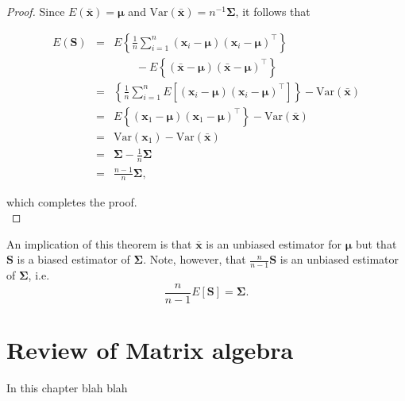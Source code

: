 \documentclass[]{book}
\theoremstyle{definition}
\theoremstyle{definition}
\theoremstyle{definition}
\theoremstyle{remark}
\begin{document}
\begin{proof}
Since \(E(\bar{\boldsymbol x})=\boldsymbol \mu\) and \(\text{Var}(\bar{\boldsymbol x})=n^{-1}\boldsymbol \Sigma\), it follows that

\begin{eqnarray*}
E(\boldsymbol S) &=& E\left \{\frac{1}{n}\sum_{i=1}^n  (\boldsymbol x_i - \boldsymbol \mu)(\boldsymbol x_i - \boldsymbol \mu)^\top \right \}\\
&& \qquad -E\left \{ (\bar{\boldsymbol x}-\boldsymbol \mu)(\bar{\boldsymbol x}-\boldsymbol \mu)^\top \right \}\\
&=&\left \{\frac{1}{n}\sum_{i=1}^n E \left [(\boldsymbol x_i - \boldsymbol \mu)(\boldsymbol x_i - \boldsymbol \mu)^\top \right ]\right \} -\text{Var}(\bar{\boldsymbol x})\\
&=&E \left \{(\boldsymbol x_1 - \boldsymbol \mu)(\boldsymbol x_1  - \boldsymbol \mu)^\top \right \} -\text{Var}(\bar{\boldsymbol x})\\
&=& \text{Var}(\boldsymbol x_1)-\text{Var}(\bar{\boldsymbol x}) \\
&=& \boldsymbol \Sigma- \frac{1}{n}\boldsymbol \Sigma\\
&=& \frac{n-1}{n}  \boldsymbol \Sigma,
\end{eqnarray*}

which completes the proof.\\
\end{proof}

An implication of this theorem is that \(\bar{\boldsymbol x}\) is an unbiased estimator for \(\boldsymbol \mu\) but that \(\boldsymbol S\) is a biased estimator of \(\boldsymbol \Sigma\). Note, however, that \({\displaystyle\frac{n}{n-1}} \boldsymbol S\) is an unbiased estimator of \(\boldsymbol \Sigma\), i.e.
\[
 \frac{n}{n-1}E[\boldsymbol S]=\boldsymbol \Sigma.
 \]

\hypertarget{linalg-prelim}{%
\chapter{Review of Matrix algebra}\label{linalg-prelim}}

In this chapter blah blah
\end{document}
